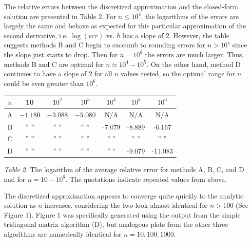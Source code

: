 \documentclass[prb,aps,twocolumn,showpacs,10pt]{revtex4-1}
\begin{document}
The relative errors between the discretized approximation and the closed-form solution are presented in Table 2. For $n\leq 10^4$, the logarithms of the errors are largely the same and behave as expected for this particular approximation of the second derivative, i.e. $\log(err)$ vs. $h$ has a slope of 2. However, the table suggests methods B and C begin to succumb to rounding errors for $n > 10^4$ since the slope just starts to drop. Then for $n = 10^6$ the errors are much larger. Thus, methods B and C are optimal for $n\approx 10^4-10^5$. On the other hand, method D continues to have a slope of 2 for all $n$ values tested, so the optimal range for $n$ could be even greater than $10^6$.


\begin{center}
\begin{tabular}{|c||c|c|c|c|c|c|}
\hline
$n$&10&$10^2$&$10^3$&$10^4$&$10^5$&$10^6$\\
\hline
\hline
A & $-1.180$ &$-3.088$&$-5.080$& N/A & N/A & N/A\\
\hline
B & ''   '' & ''   ''& ''  ''& -7.079 & -8.889 & -6.167\\
\hline
C & ''   '' & ''   ''& ''  ''& ''   '' & ''   '' & ''   ''\\
\hline
D & ''   '' & ''   ''& ''  ''& ''   '' & -9.079 & -11.083\\
\hline 
\end{tabular}
\vspace{2mm}

\textit{Table 2.} The logarithm of the average relative error for methods A, B, C, and D and for $n=10-10^6$. The quotations indicate repeated values from above. 
\end{center}

The discretized approximation appears to converge quite quickly to the analytic solution as $n$ increases, considering the two look almost identical for $n>100$ (See Figure 1). Figure 1 was specifically generated using the output from the simple tridiagonal matrix algorithm (D), but analogous plots from the other three algorithms are numerically identical for $n=10, 100, 1000$. 
\end{document}
